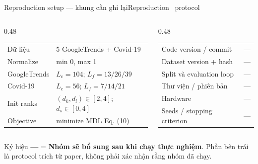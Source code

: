 \documentclass[aspectratio=169,11pt]{beamer}
\begin{document}
\begin{frame}[shrink=30]{Reproduction setup --- khung cần ghi lại}{Reproduction \textperiodcentered\ protocol}
\begin{columns}[T,onlytextwidth]
\begin{column}{0.48\textwidth}
\begin{mathcard}
  \small
  \begin{tabular}{@{}ll@{}}
    Dữ liệu & 5 GoogleTrends + Covid-19\\
    Normalize & min 0, max 1\\
    GoogleTrends & $L_c{=}104$; $L_f{=}13/26/39$\\
    Covid-19 & $L_c{=}56$; $L_f{=}7/14/21$\\
    Init ranks & $(d_k,d_l){\in}[2,4]$; $d_s{\in}[0,4]$\\
    Objective & minimize MDL Eq. (10)
  \end{tabular}
\end{mathcard}
\end{column}
\begin{column}{0.48\textwidth}
\begin{questioncard}
  \par
  \small
  \begin{tabular}{@{}ll@{}}
    Code version / commit & ---\\
    Dataset version + hash & ---\\
    Split và evaluation loop & ---\\
    Thư viện / phiên bản & ---\\
    Hardware & ---\\
    Seeds / stopping criterion & ---
  \end{tabular}
\end{questioncard}
\end{column}
\end{columns}
\vspace{5mm}
\begin{intuition}
  Ký hiệu \textbf{---} = \textbf{Nhóm sẽ bổ sung sau khi chạy thực nghiệm}. Phần bên trái là protocol trích từ paper, không phải xác nhận rằng nhóm đã chạy.
\end{intuition}
\vspace{3mm}
\end{frame}
\end{document}
